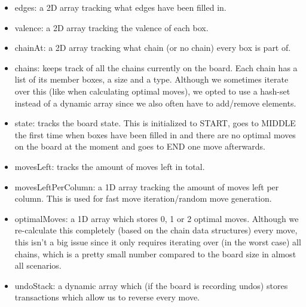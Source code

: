 \begin{itemize}
\item edges: a 2D array tracking what edges have been filled in.
\item valence: a 2D array tracking the valence of each box.
\item chainAt: a 2D array tracking what chain (or no chain) every box is part of.
\item chains: keeps track of all the chains currently on the board. Each chain has a list of its member boxes, a size and a type. Although we sometimes iterate over this (like when calculating optimal moves), we opted to use a hash-set instead of a dynamic array since we also often have to add/remove elements.
\item state: tracks the board state. This is initialized to START, goes to MIDDLE the first time when boxes have been filled in and there are no optimal moves on the board at the moment and goes to END one move afterwards.
\item movesLeft: tracks the amount of moves left in total.
\item movesLeftPerColumn: a 1D array tracking the amount of moves left per column. This is used for fast move iteration/random move generation.
\item optimalMoves: a 1D array which stores 0, 1 or 2 optimal moves. Although we re-calculate this completely (based on the chain data structures) every move, this isn't a big issue since it only requires iterating over (in the worst case) all chains, which is a pretty small number compared to the board size in almost all scenarios.
\item undoStack: a dynamic array which (if the board is recording undos) stores transactions which allow us to reverse every move.
\end{itemize}